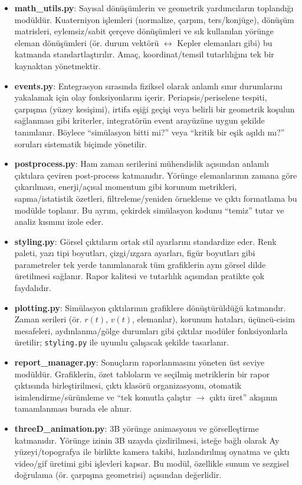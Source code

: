 \begin{itemize}
    \item \textbf{math\_utils.py}: Sayısal dönüşümlerin ve geometrik yardımcıların toplandığı modüldür.
    Kuaterniyon işlemleri (normalize, çarpım, ters/konjüge), dönüşüm matrisleri, eylemsiz/sabit çerçeve dönüşümleri ve sık kullanılan yörünge eleman dönüşümleri (ör. durum vektörü $\leftrightarrow$ Kepler elemanları gibi) bu katmanda standartlaştırılır. Amaç, koordinat/temsil tutarlılığını tek bir kaynaktan yönetmektir.

    \item \textbf{events.py}: Entegrasyon sırasında fiziksel olarak anlamlı sınır durumlarını yakalamak için
    olay fonksiyonlarını içerir. Periapsis/periselene tespiti, çarpışma (yüzey kesişimi), irtifa eşiği geçişi veya belirli bir geometrik koşulun sağlanması gibi kriterler,
    integratörün event arayüzüne uygun şekilde tanımlanır.
    Böylece ``simülasyon bitti mi?'' veya ``kritik bir eşik aşıldı mı?'' soruları sistematik biçimde yönetilir.

    \item \textbf{postprocess.py}: Ham zaman serilerini mühendislik açısından anlamlı çıktılara çeviren
    post-process katmanıdır. Yörünge elemanlarının zamana göre çıkarılması, enerji/açısal momentum gibi korunum metrikleri, sapma/istatistik özetleri, filtreleme/yeniden örnekleme ve çıktı formatlama bu modülde toplanır. Bu ayrım, çekirdek simülasyon kodunu ``temiz'' tutar ve analiz kısmını izole eder.

    \item \textbf{styling.py}: Görsel çıktıların ortak stil ayarlarını standardize eder. Renk paleti, yazı tipi boyutları, çizgi/ızgara ayarları, figür boyutları gibi parametreler tek yerde tanımlanarak tüm grafiklerin aynı görsel dilde üretilmesi sağlanır. Rapor kalitesi ve tutarlılık açısından pratikte çok faydalıdır.

    \item \textbf{plotting.py}: Simülasyon çıktılarının grafiklere dönüştürüldüğü katmandır. Zaman serileri (ör. $r(t)$, $v(t)$, elemanlar), korunum hataları, üçüncü-cisim mesafeleri, aydınlanma/gölge durumları gibi çıktılar
    modüler fonksiyonlarla üretilir; \texttt{styling.py} ile uyumlu çalışacak şekilde tasarlanır.

    \item \textbf{report\_manager.py}: Sonuçların raporlanmasını yöneten üst seviye modüldür.
    Grafiklerin, özet tabloların ve seçilmiş metriklerin bir rapor çıktısında birleştirilmesi,
    çıktı klasörü organizasyonu, otomatik isimlendirme/sürümleme ve
    ``tek komutla çalıştır $\rightarrow$ çıktı üret'' akışının tamamlanması burada ele alınır.

    \item \textbf{threeD\_animation.py}: 3B yörünge animasyonu ve görselleştirme katmanıdır.
    Yörünge izinin 3B uzayda çizdirilmesi, isteğe bağlı olarak Ay yüzeyi/topografya ile birlikte
    kamera takibi, hızlandırılmış oynatma ve çıktı video/gif üretimi gibi işlevleri kapsar.
    Bu modül, özellikle sunum ve sezgisel doğrulama (ör. çarpışma geometrisi) açısından değerlidir.
\end{itemize}

